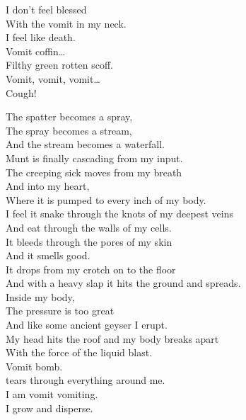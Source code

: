 I don't feel blessed \\
With the vomit in my neck. \\
I feel like death. \\

Vomit coffin… \\

Filthy green rotten scoff. \\
Vomit, vomit, vomit… \\
Cough! \\





The spatter becomes a spray, \\
The spray becomes a stream, \\
And the stream becomes a waterfall. \\
Munt is finally cascading from my input. \\

The creeping sick moves from my breath \\
And into my heart, \\
Where it is pumped to every inch of my body. \\
I feel it snake through the knots of my deepest veins \\
And eat through the walls of my cells. \\

It bleeds through the pores of my skin \\
And it smells good. \\
It drops from my crotch on to the floor \\
And with a heavy slap it hits the ground and spreads. \\

Inside my body, \\
The pressure is too great \\
And like some ancient geyser I erupt. \\
My head hits the roof and my body breaks apart \\
With the force of the liquid blast. \\

Vomit bomb. \\
 tears through everything around me. \\
I am vomit vomiting. \\
I grow and disperse. \\


